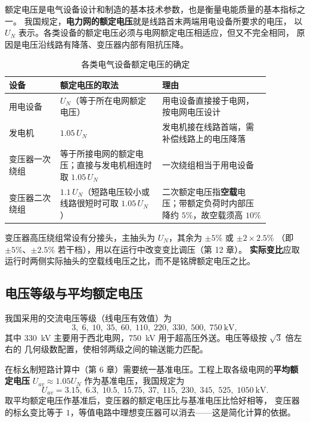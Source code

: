 额定电压是电气设备设计和制造的基本技术参数，也是衡量电能质量的基本指标之一。
我国规定，\textbf{电力网的额定电压}就是线路首末两端用电设备所要求的电压，
以 $U_N$ 表示。各类设备的额定电压必须与电网额定电压相适应，但又不完全相同，
原因是电压沿线路有降落、变压器内部有阻抗压降。

\begin{table}[htbp]
  \centering
  \caption{各类电气设备额定电压的确定}
  \small
  \begin{tabular}{@{}p{0.17\linewidth}p{0.34\linewidth}p{0.36\linewidth}@{}}
    \toprule
    设备 & 额定电压的取法 & 理由 \\
    \midrule
    用电设备 & $U_N$（等于所在电网额定电压） & 用电设备直接接于电网，按电网电压设计 \\
    发电机 & $1.05\,U_N$ & 发电机接在线路首端，需补偿线路上的电压降落 \\
    变压器一次绕组 & 等于所接电网的额定电压；\newline 直接与发电机相连时取 $1.05\,U_N$ & 一次绕组相当于用电设备 \\
    变压器二次绕组 & $1.1\,U_N$（短路电压较小或线路很短时可取 $1.05\,U_N$） & 二次额定电压指\textbf{空载}电压；带额定负荷时内部压降约 $5\%$，故空载须高 $10\%$ \\
    \bottomrule
  \end{tabular}
\end{table}


变压器高压绕组常设有分接头，主抽头为 $U_N$，其余为 $\pm 5\%$ 或 $\pm 2\times 2.5\%$
（即 $\pm 5\%$、$\pm 2.5\%$ 若干档），用以在运行中改变变比调压（第 12 章）。
\textbf{实际变比}应取运行时两侧实际抽头的空载线电压之比，而不是铭牌额定电压之比。

\subsection{电压等级与平均额定电压}

我国采用的交流电压等级（线电压有效值）为
\[
  3,\;6,\;10,\;35,\;60,\;110,\;220,\;330,\;500,\;750\ \text{kV},
\]
其中 330~kV 主要用于西北电网，750~kV 用于超高压外送。电压等级按 $\sqrt{3}$ 倍左右的
几何级数配置，使相邻两级之间的输送能力匹配。

在标幺制短路计算中（第 6 章）需要统一基准电压。工程上取各级电网的\textbf{平均额定电压}
$U_{av}\approx 1.05U_N$ 作为基准电压，我国规定为
\begin{equation}
  U_{av}=3.15,\;6.3,\;10.5,\;15.75,\;37,\;115,\;230,\;345,\;525,\;1050\ \text{kV}.
\end{equation}
取平均额定电压作基准后，变压器的额定电压比与基准电压比恰好相等，
变压器的标幺变比等于 $1$，等值电路中理想变压器可以消去——这是简化计算的依据。

